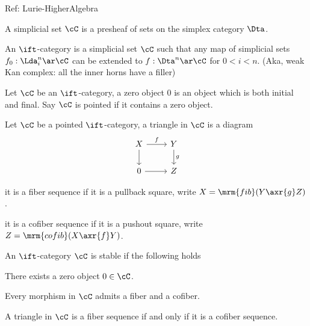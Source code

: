 \documentclass[a4paper, twoside]{article}
\begin{document}
\confighead{}{}{}



Ref: Lurie-HigherAlgebra


\begin{dfn}
    A simplicial set $\cC$ is a presheaf of sets on the simplex category $\Dta$.
\end{dfn}

\begin{dfn}[0.0.0.1]
    An $\ift$-category is a simplicial set $\cC$ such that any map of simplicial sets $f_{0}:\Lda_{i}^{n}\ar\cC$ can be extended to $f:\Dta^{n}\ar\cC$ for $0<i<n$. (Aka, weak Kan complex: all the inner horns have a filler)
\end{dfn}

\begin{dfn}[1.1.1.1]
    Let $\cC$ be an $\ift$-category, a zero object $0$ is an object which is both initial and final. Say $\cC$ is pointed if it contains a zero object.
\end{dfn}

\begin{dfn}[1.1.1.4]
    Let $\cC$ be a pointed $\ift$-category, a triangle in $\cC$ is a diagram
    \[
        \begin{tikzcd}
            X\ar[r, "f"]\ar[d] & Y\ar[d, "g"] \\
            0 \ar[r] & Z
        \end{tikzcd}
    \]
    \begin{itm}
        \item it is a fiber sequence if it is a pullback square, write $X=\mrm{fib}(Y\axr{g}Z)$.
        \item it is a cofiber sequence if it is a pushout square, write $Z=\mrm{cofib}(X\axr{f}Y)$.
    \end{itm}
\end{dfn}

\begin{dfn}[1.1.1.9]
    An $\ift$-category $\cC$ is stable if the following holds
    \begin{enr}[label=(\arabic*)]
        \item There exists a zero object $0\in\cC$.
        \item Every morphism in $\cC$ admits a fiber and a cofiber.
        \item A triangle in $\cC$ is a fiber sequence if and only if it is a cofiber sequence.
    \end{enr}

\end{dfn}
\end{document}
